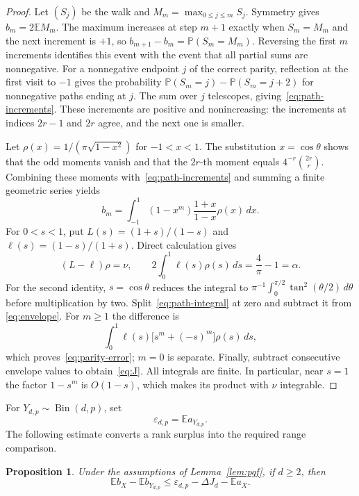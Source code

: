 \documentclass[11pt,reqno]{amsart}
\newtheorem{proposition}[theorem]{Proposition}
\theoremstyle{remark}
\numberwithin{equation}{section}
\newcommand{\E}{\mathbb E}
\newcommand{\PP}{\mathbb P}
\DeclareMathOperator{\Bin}{Bin}
\begin{document}
\begin{proof}
Let $(S_j)$ be the walk and $M_m=\max_{0\le j\le m}S_j$.
Symmetry gives $b_m=2\E M_m$. The maximum increases at step $m+1$
exactly when $S_m=M_m$ and the next increment is $+1$, so
$b_{m+1}-b_m=\PP(S_m=M_m)$.
Reversing the first $m$ increments identifies this event with the event
that all partial sums are nonnegative. For a nonnegative endpoint $j$
of the correct parity, reflection at the first visit to $-1$ gives the
probability
$\PP(S_m=j)-\PP(S_m=j+2)$ for nonnegative paths ending at $j$.
The sum over $j$ telescopes, giving~\eqref{eq:path-increments}.
These increments are positive and nonincreasing: the increments at
indices $2r-1$ and $2r$ agree, and the next one is smaller.

Let $\rho(x)=1/(\pi\sqrt{1-x^2})$ for $-1<x<1$.
The substitution $x=\cos\theta$ shows that the odd moments vanish and
that the $2r$-th moment equals $4^{-r}\binom{2r}{r}$.
Combining these moments with~\eqref{eq:path-increments} and summing a
finite geometric series yields
\begin{equation}\label{eq:path-integral}
 b_m=\int_{-1}^1(1-x^m)\frac{1+x}{1-x}\rho(x)\,dx.
\end{equation}
For $0<s<1$, put $L(s)=(1+s)/(1-s)$ and $\ell(s)=(1-s)/(1+s)$.
Direct calculation gives
\[
 (L-\ell)\rho=\nu,
 \qquad 2\int_0^1\ell(s)\rho(s)\,ds=\frac4\pi-1=\alpha.
\]
For the second identity, $s=\cos\theta$ reduces the integral to
$\pi^{-1}\int_0^{\pi/2}\tan^2(\theta/2)\,d\theta$ before multiplication
by two. Split~\eqref{eq:path-integral} at zero and subtract it from
\eqref{eq:envelope}. For $m\ge1$ the difference is
\[
 \int_0^1\ell(s)\bigl[s^m+(-s)^m\bigr]\rho(s)\,ds,
\]
which proves~\eqref{eq:parity-error}; $m=0$ is separate.
Finally, subtract consecutive envelope values to obtain~\eqref{eq:J}.
All integrals are finite. In particular, near $s=1$ the factor $1-s^m$
is $O(1-s)$, which makes its product with $\nu$ integrable.
\end{proof}

For $Y_{d,p}\sim\Bin(d,p)$, set
\[
 \varepsilon_{d,p}=\E a_{Y_{d,p}}.
\]
The following estimate converts a rank surplus into the required range
comparison.

\begin{proposition}\label{prop:comparison}
Under the assumptions of Lemma~\ref{lem:pgf}, if $d\ge2$, then
\begin{equation}\label{eq:range-comparison}
 \E b_X-\E b_{Y_{d,p}}
 \le\varepsilon_{d,p}-\Delta J_d-\E a_X.
\end{equation}
\end{proposition}
\end{document}
